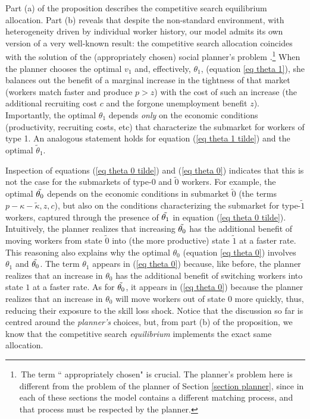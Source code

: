 \documentclass[12pt]{article} %
\theoremstyle{definition}
\begin{document}
Part (a) of the proposition describes the competitive search equilibrium allocation. Part (b) reveals that despite the non-standard environment, with  heterogeneity driven by individual worker history, our model admits its own version of a very well-known result: the competitive search allocation coincides with the solution of the (appropriately chosen) social planner's problem \citep{moen1997competitive,shimer1996essays}.\footnote{\,The term `` appropriately chosen" is crucial. The planner's problem here is different from the problem of the planner of Section \ref{section planner}, since in each of these sections the model contains a different matching process, and that process must be respected by the planner.} When the planner chooses the optimal $v_1$ and, effectively, $\theta_1$, (equation \ref{eq theta 1}), she balances out the benefit of a marginal increase in the tightness of that market (workers match faster and produce $p>z$) with the cost of such an increase (the additional recruiting cost $c$ and the forgone unemployment benefit $z$). Importantly, the optimal $\theta_1$ depends \textit{only} on the economic conditions (productivity, recruiting costs, etc) that characterize the submarket for workers of type 1. An analogous statement holds for equation (\ref{eq theta 1 tilde}) and the optimal $\tilde{\theta}_1$. 

Inspection of equations (\ref{eq theta 0 tilde}) and (\ref{eq theta 0}) indicates that this is not the case for the submarkets of type-0 and $\tilde{0}$ workers. For example, the optimal $\Tilde{\theta_0}$ depends on the economic conditions in submarket $\tilde{0}$ (the terms $p-\kappa-\tilde{\kappa}, z, c$), but also on the conditions characterizing the submarket for type-$\tilde{1}$ workers, captured through the presence of $\Tilde{\theta_1}$ in equation (\ref{eq theta 0 tilde}). Intuitively, the planner realizes that increasing $\Tilde{\theta_0}$ has the additional benefit of moving workers from state $\tilde{0}$ into (the more productive) state $\tilde{1}$ at a faster rate. This reasoning also explains why the optimal $\theta_0$ (equation \ref{eq theta 0}) involves $\theta_1$ and $\Tilde{\theta_0}$. The term $\theta_1$ appears in (\ref{eq theta 0}) because, like before, the planner realizes that an increase in ${\theta_0}$ has the additional benefit of switching workers into state ${1}$ at a faster rate. As for $\Tilde{\theta_0}$, it appears in (\ref{eq theta 0}) because the planner realizes that an increase in ${\theta_0}$ will move workers out of state 0 more quickly, thus, reducing their exposure to the skill loss shock. Notice that the discussion so far is centred around the \textit{planner's} choices, but, from part (b) of the proposition, we know that the competitive search \textit{equilibrium} implements the exact same allocation.   
\end{document}

